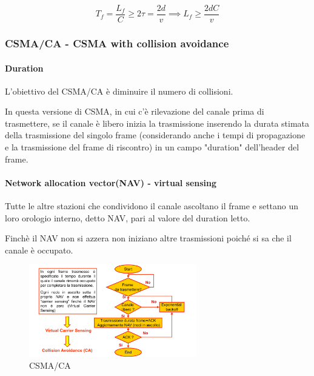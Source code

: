\begin{figure}[htbp]
\begin{minipage}{0.5\textwidth}
\begin{equation}
 T_f = \frac{L_f}{C} \geq 2\tau = \frac{2d}{v} \implies L_f \geq \frac{2dC}{v}
\end{equation}





    \end{minipage}
\end{figure}
\subsubsection{CSMA/CA - CSMA with collision avoidance}
\paragraph{Duration}
L'obiettivo del CSMA/CA è diminuire il numero di collisioni.

In questa versione di CSMA, in cui c'è rilevazione del canale prima di trasmettere, se il canale è libero inizia la trasmissione inserendo la durata stimata della trasmissione del singolo frame (considerando anche i tempi di propagazione e la trasmissione del frame di riscontro) in un campo "duration" dell'header del frame.

\paragraph{Network allocation vector(NAV) - virtual sensing} Tutte le altre stazioni che condividono il canale ascoltano il frame e settano un
loro orologio interno, detto NAV, pari al valore del duration letto.

Finchè il NAV non si azzera non iniziano altre trasmissioni poiché si sa che il canale è occupato.
\begin{figure}[htbp]
    \centering
    \includegraphics[width=0.65\textwidth]{images/csmaca.png}
    \caption{CSMA/CA}
    \label{fig:csma-ca}
\end{figure}